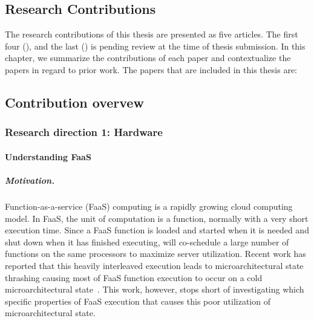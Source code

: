\documentclass[../main.tex]{subfiles}
\begin{document}
\ifx\chapincluded\undefined
  \begin{refsection}
 \fi

 \chapter{Research Contributions}
\label{chap:rcontrib}

The research contributions of this thesis are presented as five articles. The first four (), and the last () is pending review at the time of thesis submission. In this chapter, we summarize the contributions of each paper and contextualize the papers in regard to prior work. The papers that are included in this thesis are:




\section{Contribution overvew}

\subsection{Research direction 1: Hardware}

\subsubsection{Understanding FaaS}

\paragraph{Motivation.} Function-as-a-service (FaaS) computing is a rapidly growing cloud computing model. In FaaS, the unit of computation is a function, normally with a very short execution time. Since a FaaS function is loaded and started when it is needed and shut down when it has finished executing, will co-schedule a large number of functions on the same processors to maximize server utilization. Recent work has reported that this heavily interleaved execution leads to microarchitectural state thrashing causing most of FaaS function execution to occur on a cold microarchitectural state~\cite{shahrad19_archit_implic_funct_servic_comput,lukewarm_serverless}. This work, however, stops short of investigating which specific properties of FaaS execution that causes this poor utilization of microarchitectural state.


\end{refsection}
\end{document}
